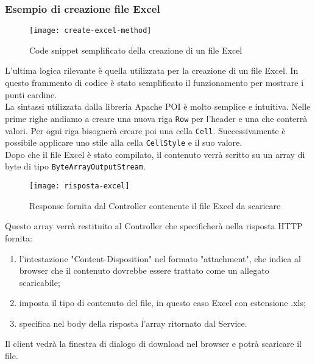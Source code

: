 \subsubsection{Esempio di creazione file Excel}
\begin{figure}[H] 
    \centering 
    \texttt{[image: create-excel-method]} 
    \caption{Code snippet semplificato della creazione di un file Excel}
\end{figure}
L'ultima logica rilevante è quella utilizzata per la creazione di un file Excel. In questo frammento di codice è stato semplificato il funzionamento per mostrare i punti cardine.\\
La sintassi utilizzata dalla libreria Apache POI è molto semplice e intuitiva. Nelle prime righe andiamo a creare una nuova riga \texttt{Row} per l'header e una che conterrà valori. Per ogni riga bisognerà creare poi una cella \texttt{Cell}. Successivamente è possibile applicare uno stile alla cella \texttt{CellStyle} e il suo valore.\\
Dopo che il file Excel è stato compilato, il contenuto verrà scritto su un array di byte di tipo \texttt{ByteArrayOutputStream}.
\begin{figure}[H] 
    \centering 
    \texttt{[image: risposta-excel]} 
    \caption{Response fornita dal Controller contenente il file Excel da scaricare}
\end{figure}
\noindent Questo array verrà restituito al Controller che specificherà nella risposta HTTP fornita:
\begin{enumerate}
\item l'intestazione "Content-Disposition" nel formato "attachment", che indica al browser che il contenuto dovrebbe essere trattato come un allegato scaricabile;
\item imposta il tipo di contenuto del file, in questo caso Excel con estensione .xls;
\item specifica nel body della risposta l'array ritornato dal Service.
\end{enumerate}
Il client vedrà la finestra di dialogo di download nel browser e potrà scaricare il file.